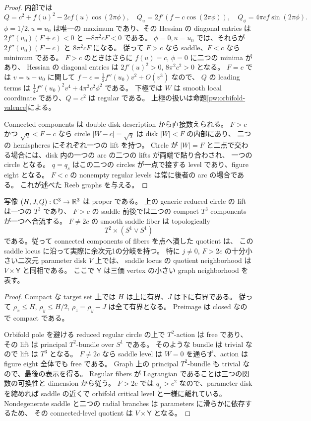 \begin{proof}
内部では
\[
 Q=c^2+f(u)^2-2cf(u)\cos(2\pi\phi),\quad
 Q_u=2f'(f-c\cos(2\pi\phi)),\quad
 Q_\phi=4\pi cf\sin(2\pi\phi).
\]
$\phi=1/2,u=u_0$ は唯一の maximum であり、その Hessian の diagonal entries は
$2f''(u_0)(F+c)<0$ と $-8\pi^2cF<0$ である。
$\phi=0,u=u_0$ では、それらが $2f''(u_0)(F-c)$ と $8\pi^2cF$ になる。
従って $F>c$ なら saddle、$F<c$ なら minimum である。
$F>c$ のときはさらに $f(u)=c$, $\phi=0$ に二つの minima があり、
Hessian の diagonal entries は $2f'(u)^2>0$, $8\pi^2c^2>0$ となる。
$F=c$ では $v=u-u_0$ に関して $f-c=\frac12f''(u_0)v^2+O(v^3)$ なので、
$Q$ の leading terms は $\frac14f''(u_0)^2v^4+4\pi^2c^2\phi^2$ である。
下極では $W$ は smooth local coordinate であり、$Q=c^2$ は regular である。
上極の扱いは命題\ref{pw:orbifold-valence}による。

Connected components は double-disk description から直接数えられる。
$F>c$ かつ $\sqrt q<F-c$ なら circle $|W-c|=\sqrt q$ は disk $|W|<F$ の内部にあり、
二つの hemispheres にそれぞれ一つの lift を持つ。
Circle が $|W|=F$ と二点で交わる場合には、disk 内の一つの arc の二つの lifts が両端で貼り合わされ、
一つの circle となる。
$q=q_s$ はこの二つの circles が一点で接する level であり、figure eight となる。
$F<c$ の nonempty regular levels は常に後者の arc の場合である。
これが述べた Reeb graphs を与える。
\end{proof}

\begin{corollary}
\label{pw:compact}
写像 $(H,J,Q):\mathbb C^3\to\mathbb R^3$ は proper である。
上の generic reduced circle の lift は一つの $T^3$ であり、
$F>c$ の saddle 前後では二つの compact $T^3$ components が一つへ合流する。
$F\ne2c$ の smooth saddle fiber は topologically
\[
 T^2\times(S^1\vee S^1)
\]
である。従って connected components of fibers を点へ潰した quotient は、
この saddle locus に沿って実際に余次元1の分岐を持つ。
特に $j\ne0$, $F>2c$ の十分小さい二次元 parameter disk $V$ 上では、
saddle locus の quotient neighborhood は $V\times\mathsf Y$ と同相である。
ここで $\mathsf Y$ は三価 vertex の小さい graph neighborhood を表す。
\end{corollary}

\begin{proof}
Compact な target set 上では $H$ は上に有界、$J$ は下に有界である。
従って $\rho_x\le H$, $\rho_y\le H/2$, $\rho_z=\rho_y-J$ は全て有界となる。
Preimage は closed なので compact である。

Orbifold pole を避ける reduced regular circle の上で $T^2$-action は free であり、
その lift は principal $T^2$-bundle over $S^1$ である。
そのような bundle は trivial なので lift は $T^3$ となる。
$F\ne2c$ なら saddle level は $W=0$ を通らず、action は figure eight 全体でも free である。
Graph 上の principal $T^2$-bundle も trivial なので、最後の表示を得る。
Regular fibers が Lagrangian であることは三つの関数の可換性と dimension から従う。
$F>2c$ では $q_s>c^2$ なので、parameter disk を縮めれば saddle の近くで
orbifold critical level と一様に離れている。
Nondegenerate saddle と二つの radial branches は parameters に滑らかに依存するため、
その connected-level quotient は $V\times\mathsf Y$ となる。
\end{proof}

